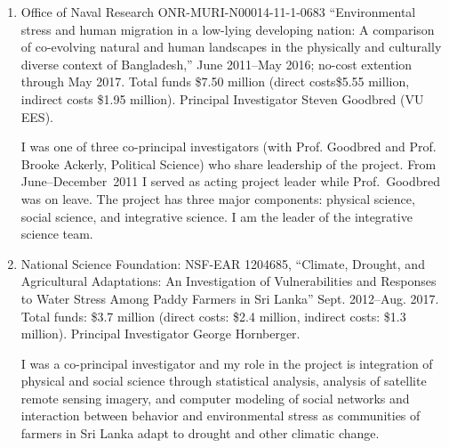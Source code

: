 \begin{enumerate}
\begin{credit}
I was co-principal investigator and my role was computer modeling of behavioral responses to water scarcity by farmers. I supervised Prof. Hornberger's Ph.D. student John Jacobi for part of his dissertation project which used agent-based modeling of farmer behavior.
\end{credit}
%
%
\item Office of Naval Research ONR-MURI-N00014-11-1-0683 ``Environmental stress and human migration in a low-lying developing nation: A comparison of co-evolving natural and human landscapes in the physically and culturally diverse context of Bangladesh,'' June 2011--May 2016; no-cost extention through May 2017. Total funds \$7.50 million (direct costs\$5.55 million, indirect costs \$1.95 million). Principal Investigator Steven Goodbred (VU EES).
\begin{credit}
I was one of three co-principal investigators (with Prof. Goodbred and Prof. Brooke Ackerly, Political Science) who share leadership of the project. From June--December~2011 I served as acting project leader while Prof.~Goodbred was on leave. The project has three major components: physical science, social science, and integrative science. I am the leader of the integrative science team.
\end{credit}
%
%
\item National Science Foundation: NSF-EAR 1204685, ``Climate, Drought, and Agricultural Adaptations: An Investigation of Vulnerabilities and Responses to Water Stress Among Paddy Farmers in Sri Lanka'' Sept. 2012--Aug. 2017. Total funds: \$3.7 million (direct costs: \$2.4 million, indirect costs: \$1.3 million). Principal Investigator George Hornberger.
\begin{credit}
I was a co-principal investigator and my role in the project is integration of physical and social science through statistical analysis, analysis of satellite remote sensing imagery, and computer modeling of social networks and interaction between behavior and environmental stress as communities of farmers in Sri Lanka adapt to drought and other climatic change.
\end{credit}
\end{enumerate}
\iffalse
\subsubsection{Under Review}
\begin{enumerate}

\end{enumerate}%
\fi
